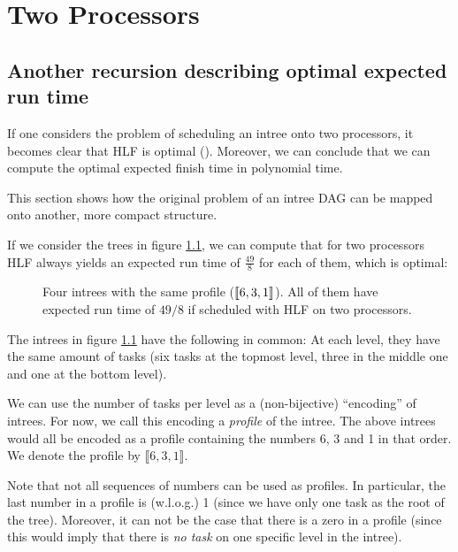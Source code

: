 \chapter{Two Processors}
\label{chap:p2}

\section{Another recursion describing optimal expected run time}
\label{sec:p2-simple-method-for-runtime}

If one considers the problem of scheduling an intree onto two processors, it becomes clear that HLF is optimal (). Moreover, we can conclude that we can compute the optimal expected finish time in polynomial time.

This section shows how the original problem of an intree DAG can be mapped onto another, more compact structure.

If we consider the trees in figure \ref{fig:p2-four-intrees-with-same-profile-6-3-1}, we can compute that for two processors HLF always yields an expected run time of $\frac{49}{8}$ for each of them, which is optimal:

\begin{figure}[ht]
  \centering
  \hspace{0.5cm}
  \hspace{0.5cm}
  \hspace{0.5cm}
  
  \caption{Four intrees with the same profile ($\llbracket 6,3,1 \rrbracket$). All of them have expected run time of $49/8$ if scheduled with HLF on two processors.}
  \label{fig:p2-four-intrees-with-same-profile-6-3-1}
\end{figure}

The intrees in figure \ref{fig:p2-four-intrees-with-same-profile-6-3-1} have the following in common: At each level, they have the same amount of tasks (six tasks at the topmost level, three in the middle one and one at the bottom level).

We can use the number of tasks per level as a (non-bijective) ``encoding'' of intrees. For now, we call this encoding a \emph{profile} of the intree. The above intrees would all be encoded as a profile containing the numbers 6, 3 and 1 in that order. We denote the profile by $\llbracket 6, 3, 1 \rrbracket$.

Note that not all sequences of numbers can be used as profiles. In particular, the last number in a profile is (w.l.o.g.) 1 (since we have only one task as the root of the tree). Moreover, it can not be the case that there is a zero in a profile (since this would imply that there is \emph{no task} on one specific level in the intree).

